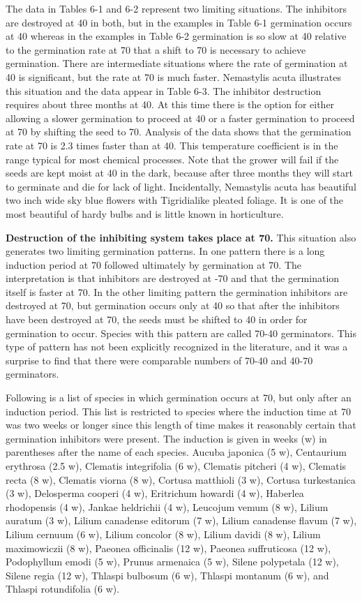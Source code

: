 The data in Tables 6-1 and 6-2 represent two limiting situations. The inhibitors
are destroyed at 40 in both, but in the examples in Table 6-1 germination occurs at 40
whereas in the examples in Table 6-2 germination is so slow at 40 relative to the
germination rate at 70 that a shift to 70 is necessary to achieve germination.
There are intermediate situations where the rate of germination at 40 is
significant, but the rate at 70 is much faster. Nemastylis acuta illustrates this situation
and the data appear in Table 6-3. The inhibitor destruction requires about three
months at 40. At this time there is the option for either allowing a slower germination to
proceed at 40 or a faster germination to proceed at 70 by shifting the seed to 70.
Analysis of the data shows that the germination rate at 70 is 2.3 times faster than at 40.
This temperature coefficient is in the range typical for most chemical processes. Note
that the grower will fail if the seeds are kept moist at 40 in the dark, because after three
months they will start to germinate and die for lack of light. Incidentally, Nemastylis
acuta has beautiful two inch wide sky blue flowers with Tigridialike pleated foliage. It
is one of the most beautiful of hardy bulbs and is little known in horticulture.

\textbf{Destruction of the inhibiting system takes place at 70.} This situation
also generates two limiting germination patterns. In one pattern there is a long
induction period at 70 followed ultimately by germination at 70. The interpretation is
that inhibitors are destroyed at -70 and that the germination itself is faster at 70. In the
other limiting pattern the germination inhibitors are destroyed at 70, but germination
occurs only at 40 so that after the inhibitors have been destroyed at 70, the seeds must
be shifted to 40 in order for germination to occur. Species with this pattern are called
70-40 germinators. This type of pattern has not been explicitly recognized in the
literature, and it was a surprise to find that there were comparable numbers of 70-40
and 40-70 germinators.

Following is a list of species in which germination occurs at 70, but only after an
induction period. This list is restricted to species where the induction time at 70 was
two weeks or longer since this length of time makes it reasonably certain that
germination inhibitors were present. The induction is given in weeks (w) in
parentheses after the name of each species. Aucuba japonica (5 w), Centaurium
erythrosa (2.5 w), Clematis integrifolia (6 w), Clematis pitcheri (4 w), Clematis recta (8
w), Clematis viorna (8 w), Cortusa matthioli (3 w), Cortusa turkestanica (3 w),
Delosperma cooperi (4 w), Eritrichum howardi (4 w), Haberlea rhodopensis (4 w),
Jankae heldrichii (4 w), Leucojum vemum (8 w), Lilium auratum (3 w), Lilium
canadense editorum (7 w), Lilium canadense flavum (7 w), Lilium cernuum (6 w),
Lilium concolor (8 w), Lilium davidi (8 w), Lilium maximowiczii (8 w), Paeonea
officinalis (12 w), Paeonea suffruticosa (12 w), Podophyllum emodi (5 w), Prunus
armenaica (5 w), Silene polypetala (12 w), Silene regia (12 w), Thlaspi bulbosum
(6 w), Thlaspi montanum (6 w), and Thlaspi rotundifolia (6 w).

